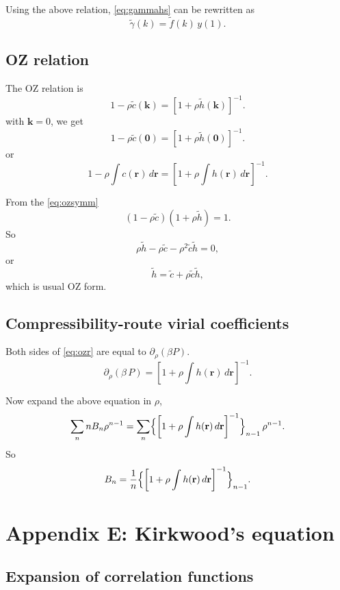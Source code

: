 \documentclass[preprint]{revtex4-1}
\numberwithin{equation}{subsection}
\numberwithin{table}{section}
\newcommand{\vct}[1]{\mathbf{#1}}
\providecommand{\vr}{} %
\renewcommand{\vr}{\vct{r}}
\newcommand{\vk}{\vct{k}}
\begin{document}
Using the above relation, \eqref{eq:gammahs}
can be rewritten as
\[
  \tilde{\gamma}(k) = \tilde{f}(k) \, y(1).
\]




\subsection{OZ relation}

The OZ relation is
\begin{equation}
  1 - \rho \tilde c(\vk)
=
 [1 + \rho \tilde h(\vk)]^{-1}.
 \label{eq:ozsymm}
\end{equation}
%
with $\vk = 0$, we get
\[
  1 - \rho \tilde c(\vct 0)
=
 [1 + \rho \tilde h(\vct 0)]^{-1}.
\]
or
\begin{equation}
  1 - \rho \int c(\vr) \, d\vr
=
 \left[1 + \rho \int h(\vr) \, d\vr \right]^{-1}.
 \label{eq:ozr}
\end{equation}


From the \eqref{eq:ozsymm}
\[
  (1 - \rho \tilde{c}) (1 + \rho \tilde{h}) = 1.
\]
So
\[
  \rho \tilde{h} - \rho \tilde{c} - \rho^2 \tilde{c} \tilde{h} = 0,
\]
or
\[
   \tilde{h} = \tilde{c} + \rho \tilde{c} \tilde{h},
\]
which is usual OZ form.



\subsection{Compressibility-route virial coefficients}



Both sides of \eqref{eq:ozr}
are equal to $\partial_\rho (\beta P)$.
\begin{equation*}
  \partial_\rho (\beta \, P)
=
 \left[1 + \rho \int h(\vr) \, d\vr \right]^{-1}.
\end{equation*}

Now expand the above equation in $\rho$,
\[
  \sum_n n B_n \rho^{n-1}
=
  \sum_n
  \Bigl\{
    \left[1 + \rho \int h(\vr) \, d\vr \right]^{-1}
  \Bigr\}_{n - 1} \, \rho^{n-1}.
\]
So
\[
  B_n
=
\frac{1}{n}
  \Bigl\{
    \left[1 + \rho \int h(\vr) \, d\vr \right]^{-1}
  \Bigr\}_{n - 1}.
\]



\section{Appendix E: Kirkwood's equation}

\subsection{Expansion of correlation functions}
\end{document}
